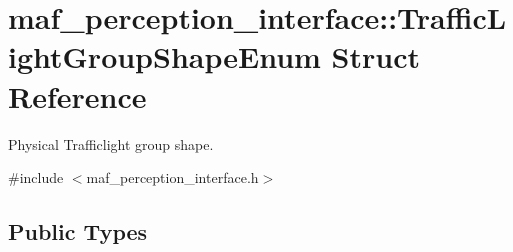 \hypertarget{structmaf__perception__interface_1_1TrafficLightGroupShapeEnum}{}\section{maf\+\_\+perception\+\_\+interface\+:\+:Traffic\+Light\+Group\+Shape\+Enum Struct Reference}
\label{structmaf__perception__interface_1_1TrafficLightGroupShapeEnum}


Physical Trafficlight group shape.  




{\ttfamily \#include $<$maf\+\_\+perception\+\_\+interface.\+h$>$}

\subsection*{Public Types}
